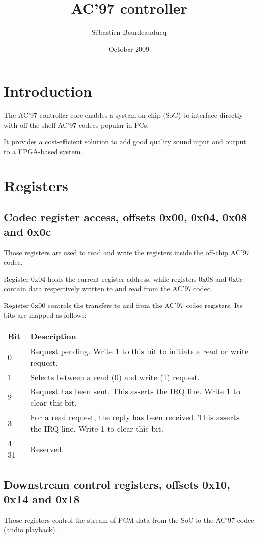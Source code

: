 \documentclass[a4paper,11pt]{article}
\title{AC'97 controller}
\author{S\'ebastien Bourdeauducq}
\date{October 2009}
\begin{document}
\setlength{\parindent}{0pt}
\setlength{\parskip}{5pt}
\maketitle{}
\section{Introduction}
The AC'97 controller core enables a system-on-chip (SoC) to interface directly with off-the-shelf AC'97 codecs popular in PCs.

It provides a cost-efficient solution to add good quality sound input and output to a FPGA-based system.

\section{Registers}
\subsection{Codec register access, offsets 0x00, 0x04, 0x08 and 0x0c}
Those registers are used to read and write the registers inside the off-chip AC'97 codec.

Register 0x04 holds the current register address, while registers 0x08 and 0x0c contain data respectively written to and read from the AC'97 codec.

Register 0x00 controls the transfers to and from the AC'97 codec registers. Its bits are mapped as follows:

\begin{tabularx}{\textwidth}{|l|X|}
\hline
\textbf{Bit} & \textbf{Description} \\
\hline
0 & Request pending. Write 1 to this bit to initiate a read or write request. \\
\hline
1 & Selects between a read (0) and write (1) request. \\
\hline
2 & Request has been sent. This asserts the IRQ line. Write 1 to clear this bit. \\
\hline
3 & For a read request, the reply has been received. This asserts the IRQ line. Write 1 to clear this bit. \\
\hline
4--31 & Reserved. \\
\hline
\end{tabularx}

\subsection{Downstream control registers, offsets 0x10, 0x14 and 0x18}
Those registers control the stream of PCM data from the SoC to the AC'97 codec (audio playback).
\end{document}
